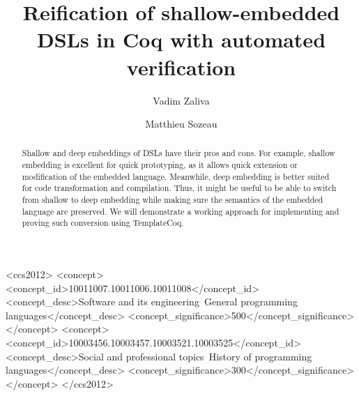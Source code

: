 \documentclass[sigplan]{acmart}\settopmatter{printfolios=true,printccs=false,printacmref=false}
\begin{document}
\title{Reification of shallow-embedded DSLs in Coq with automated verification}         %


\author{Vadim Zaliva}

\author{Matthieu Sozeau}


\begin{abstract}
  Shallow and deep embeddings of DSLs have their pros and cons. For example,
  shallow embedding is excellent for quick prototyping, as it allows
  quick extension or modification of the embedded language.  Meanwhile, deep
  embedding is better suited for code transformation and compilation.
  Thus, it might be useful to be able to switch from shallow to deep
  embedding while making sure the semantics of the embedded language are
  preserved. We will demonstrate a working approach for implementing
  and proving such conversion using TemplateCoq.
\end{abstract}


\begin{CCSXML}
<ccs2012>
<concept>
<concept_id>10011007.10011006.10011008</concept_id>
<concept_desc>Software and its engineering~General programming languages</concept_desc>
<concept_significance>500</concept_significance>
</concept>
<concept>
<concept_id>10003456.10003457.10003521.10003525</concept_id>
<concept_desc>Social and professional topics~History of programming languages</concept_desc>
<concept_significance>300</concept_significance>
</concept>
</ccs2012>
\end{CCSXML}

\end{document}
